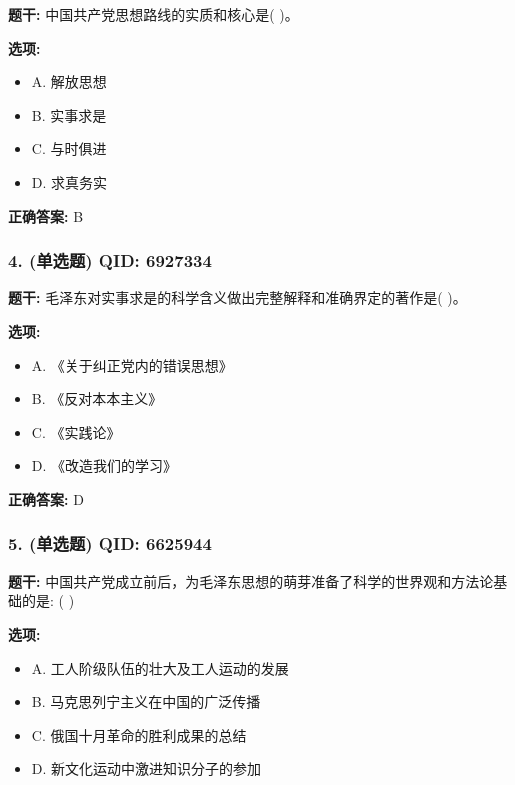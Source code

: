 \documentclass[12pt,UTF8]{ctexart}
\begin{document}
\textbf{题干:}
中国共产党思想路线的实质和核心是(   )。

\textbf{选项:}
\begin{itemize}[leftmargin=*]

  \item A. 解放思想

  \item B. 实事求是

  \item C. 与时俱进

  \item D. 求真务实

\end{itemize}

\textbf{正确答案:}
B

\vspace{0.3em}\hrulefill\vspace{0.7em}

\subsubsection*{4. (单选题) \small QID: 6927334}

\textbf{题干:}
毛泽东对实事求是的科学含义做出完整解释和准确界定的著作是(   )。

\textbf{选项:}
\begin{itemize}[leftmargin=*]

  \item A. 《关于纠正党内的错误思想》

  \item B. 《反对本本主义》

  \item C. 《实践论》

  \item D. 《改造我们的学习》

\end{itemize}

\textbf{正确答案:}
D

\vspace{0.3em}\hrulefill\vspace{0.7em}

\subsubsection*{5. (单选题) \small QID: 6625944}

\textbf{题干:}
中国共产党成立前后，为毛泽东思想的萌芽准备了科学的世界观和方法论基础的是: ( )

\textbf{选项:}
\begin{itemize}[leftmargin=*]

  \item A. 工人阶级队伍的壮大及工人运动的发展

  \item B. 马克思列宁主义在中国的广泛传播

  \item C. 俄国十月革命的胜利成果的总结

  \item D. 新文化运动中激进知识分子的参加

\end{itemize}
\end{document}
